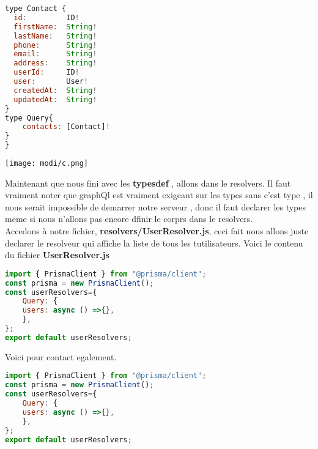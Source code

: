 \documentclass{article}
\begin{document}
\begin{lstlisting}[language=JavaScript]
type Contact {
  id:         ID!       
  firstName:  String!   
  lastName:   String!    
  phone:      String!   
  email:      String!   
  address:    String!  
  userId:     ID!       
  user:       User!      
  createdAt:  String! 
  updatedAt:  String! 
}
type Query{
    contacts: [Contact]!
}
}
 \end{lstlisting}
\begin{center} 
    \texttt{[image: modi/c.png]} 
\end{center}


Maintenant que nous fini avec les \textbf{typesdef} , allons dans le resolvers. Il faut vraiment noter que graphQl est vraiment exigeant sur les types sans c'est type , il nous serait impossible de demarrer notre serveur , donc il faut declarer les types meme si nous n'allons pas encore dfinir le corprs dans le resolvers.\\ Accedons à notre fichier, \textbf{resolvers/UserResolver.js}, ceci fait nous allons juste declarer le resolveur qui affiche la liste de tous les tutilisateurs. Voici le contenu du fichier \textbf{UserResolver.js}

\begin{lstlisting}[language=JavaScript]
import { PrismaClient } from "@prisma/client";
const prisma = new PrismaClient();
const userResolvers={
    Query: {
    users: async () =>{},
    },
};
export default userResolvers;
 \end{lstlisting}
 Voici pour contact egalement.
 


\begin{lstlisting}[language=JavaScript]
import { PrismaClient } from "@prisma/client";
const prisma = new PrismaClient();
const userResolvers={
    Query: {
    users: async () =>{},
    },
};
export default userResolvers;
 \end{lstlisting}
\end{document}
